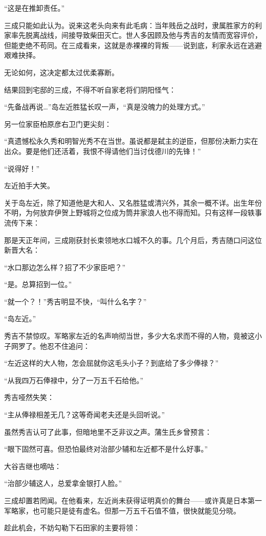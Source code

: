 \documentclass[
]{article}
\begin{document}
``这是在推卸责任。''

三成只能如此认为。说来这老头向来有此毛病：当年贱岳之战时，隶属胜家方的利家率先脱离战线，间接导致柴田灭亡。世人多因顾及他与秀吉的友情而宽容评价，但能吏绝不苟同。在三成看来，这就是赤裸裸的背叛------说到底，利家永远在逃避艰难抉择。

无论如何，这决定都太过优柔寡断。

结果回到宅邸的三成，不得不听自家老将们阴阳怪气：

``先备战再说\ldots{}''岛左近胜猛长叹一声，``真是没魄力的处理方式。''

另一位家臣柏原彦右卫门更尖刻：

``真遗憾松永久秀和明智光秀不在当世。虽说都是弑主的逆臣，但那份决断力实在出众。要是他们还活着，我恨不得请他们当讨伐德川的先锋！''

``说得好！''

左近拍手大笑。

关于岛左近，除了知道他是大和人、又名胜猛或清兴外，其余一概不详。出生年份不明，为何放弃伊贺上野城将之位成为筒井家浪人也不得而知。只有这样一段轶事流传下来：

那是天正年间，三成刚获封长束领地水口城不久的事。几个月后，秀吉随口问这位新晋大名：

``水口那边怎么样？招了不少家臣吧？''

``是。总算招到一位。''

``就一个？！''秀吉明显不快，``叫什么名字？''

``岛左近。''

秀吉不禁惊叹。军略家左近的名声响彻当世，多少大名求而不得的人物，竟被这小子网罗了。他忍不住追问：

``左近这样的大人物，怎会屈就你这毛头小子？到底给了多少俸禄？''

``从我四万石俸禄中，分了一万五千石给他。''

秀吉哑然失笑：

``主从俸禄相差无几？这等奇闻老夫还是头回听说。''

虽然秀吉认可了此事，但暗地里不乏非议之声。蒲生氏乡曾预言：

``眼下固然可喜。但恐怕最终对治部少辅和左近都不是什么好事。''

大谷吉继也嘀咕：

``治部少辅这人，总爱拿金银打人脸。''

三成却置若罔闻。在他看来，左近尚未获得证明真价的舞台------或许真是日本第一军略家，也可能只是徒有虚名。但那一万五千石值不值，很快就能见分晓。

趁此机会，不妨勾勒下石田家的主要将领：
\end{document}

